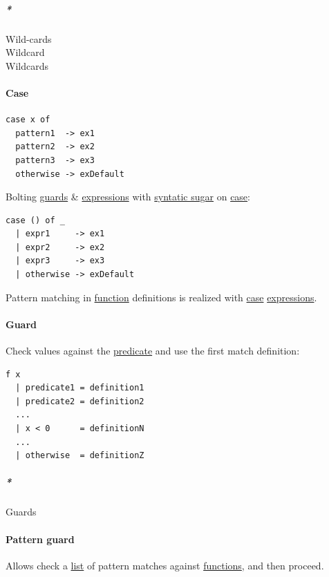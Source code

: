 \documentclass[11pt]{article}
\begin{document}
\subparagraph{\emph{*}}
\label{sec:orga5054c9}
\label{org34d59cc}Wild-cards\\
\label{orgdf69265}Wildcard\\
\label{org9add70a}Wildcards\\

\paragraph{\label{org41d12b6}Case}
\label{sec:org39f9095}
\begin{verbatim}
case x of
  pattern1  -> ex1
  pattern2  -> ex2
  pattern3  -> ex3
  otherwise -> exDefault
\end{verbatim}

Bolting \hyperref[orgc6782d2]{guards} \& \hyperref[org3731c99]{expressions} with \hyperref[org5d11ea2]{syntatic sugar} on \hyperref[org41d12b6]{case}:\\
\begin{verbatim}
case () of _
  | expr1     -> ex1
  | expr2     -> ex2
  | expr3     -> ex3
  | otherwise -> exDefault
\end{verbatim}

Pattern matching in \hyperref[orge15bc14]{function} definitions is realized with \hyperref[org41d12b6]{case} \hyperref[org3731c99]{expressions}.\\

\paragraph{\label{org5c9af64}Guard}
\label{sec:orga934740}
Check values against the \hyperref[orgec7f705]{predicate} and use the first match definition:\\

\begin{verbatim}
f x
  | predicate1 = definition1
  | predicate2 = definition2
  ...
  | x < 0      = definitionN
  ...
  | otherwise  = definitionZ
\end{verbatim}

\subparagraph{\emph{*}}
\label{sec:org26b0507}

\label{orgc6782d2}Guards\\

\paragraph{\label{orgfbc50d8}Pattern guard}
\label{sec:org353a079}
Allows check a \hyperref[org874a6e0]{list} of pattern matches against \hyperref[orgaa8fb87]{functions}, and then proceed.\\
\end{document}
